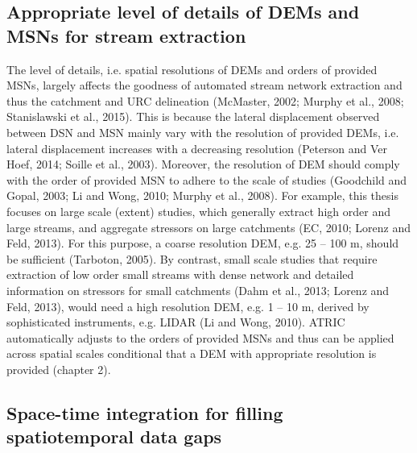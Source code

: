 \subsection{Appropriate level of details of DEMs and MSNs for stream extraction}
\label{Appropriate level of details of DEMs and MSNs for stream extraction}

The level of details, i.e. spatial resolutions of DEMs and orders of provided MSNs, largely affects the goodness of automated stream network extraction and thus the catchment and URC delineation (McMaster, 2002; Murphy et al., 2008; Stanislawski et al., 2015). This is because the lateral displacement observed between DSN and MSN mainly vary with the resolution of provided DEMs, i.e. lateral displacement increases with a decreasing resolution (Peterson and Ver Hoef, 2014; Soille et al., 2003). Moreover, the resolution of DEM should comply with the order of provided MSN to adhere to the scale of studies (Goodchild and Gopal, 2003; Li and Wong, 2010; Murphy et al., 2008). For example, this thesis focuses on large scale (extent) studies, which generally extract high order and large streams, and aggregate stressors on large catchments (EC, 2010; Lorenz and Feld, 2013). For this purpose, a coarse resolution DEM, e.g. 25 – 100 m, should be sufficient (Tarboton, 2005). By contrast, small scale studies that require extraction of low order small streams with dense network and detailed information on stressors for small catchments (Dahm et al., 2013; Lorenz and Feld, 2013), would need a high resolution DEM, e.g. 1 – 10 m, derived by sophisticated instruments, e.g. LIDAR (Li and Wong, 2010). ATRIC automatically adjusts to the orders of provided MSNs and thus can be applied across spatial scales conditional that a DEM with appropriate resolution is provided (chapter 2).

\subsection{Space-time integration for filling spatiotemporal data gaps}
\label{Space-time integration for filling spatiotemporal data gaps}

